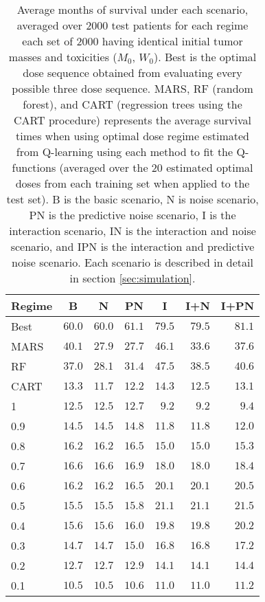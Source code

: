 \documentclass[12pt]{article}
\begin{document}
\begin{table}[!htbp]
\caption[Average months of survival under each scenario]{Average months of survival under each scenario, averaged over 2000 test patients for each regime each set of 2000 having identical initial tumor masses and toxicities ($M_{0}$, $W_{0}$). Best is the optimal dose sequence obtained from evaluating every possible three dose sequence. MARS, RF (random forest), and CART (regression trees using the CART procedure) represents the average survival times when using optimal dose regime estimated from Q-learning using each method to fit the Q-functions (averaged over the 20 estimated optimal doses from each training set when applied to the test set). B is the basic scenario, N is noise scenario, PN is the predictive noise scenario, I is the interaction scenario, IN is the interaction and noise scenario, and IPN is the interaction and predictive noise scenario. Each scenario is described in detail in section \ref{sec:simulation}.\label{tab:rewards}} 
\begin{center}
\begin{tabular}{lrrrrrr}
\toprule
\multicolumn{1}{c}{Regime}&\multicolumn{1}{c}{B}&\multicolumn{1}{c}{N}&\multicolumn{1}{c}{PN}&\multicolumn{1}{c}{I}&\multicolumn{1}{c}{I+N}&\multicolumn{1}{c}{I+PN}\tabularnewline
\midrule
Best&$60.0$&$60.0$&$61.1$&$79.5$&$79.5$&$81.1$\tabularnewline
MARS&$40.1$&$27.9$&$27.7$&$46.1$&$33.6$&$37.6$\tabularnewline
RF&$37.0$&$28.1$&$31.4$&$47.5$&$38.5$&$40.6$\tabularnewline
CART&$13.3$&$11.7$&$12.2$&$14.3$&$12.5$&$13.1$\tabularnewline
1&$12.5$&$12.5$&$12.7$&$ 9.2$&$ 9.2$&$ 9.4$\tabularnewline
0.9&$14.5$&$14.5$&$14.8$&$11.8$&$11.8$&$12.0$\tabularnewline
0.8&$16.2$&$16.2$&$16.5$&$15.0$&$15.0$&$15.3$\tabularnewline
0.7&$16.6$&$16.6$&$16.9$&$18.0$&$18.0$&$18.4$\tabularnewline
0.6&$16.2$&$16.2$&$16.5$&$20.1$&$20.1$&$20.5$\tabularnewline
0.5&$15.5$&$15.5$&$15.8$&$21.1$&$21.1$&$21.5$\tabularnewline
0.4&$15.6$&$15.6$&$16.0$&$19.8$&$19.8$&$20.2$\tabularnewline
0.3&$14.7$&$14.7$&$15.0$&$16.8$&$16.8$&$17.2$\tabularnewline
0.2&$12.7$&$12.7$&$12.9$&$14.1$&$14.1$&$14.4$\tabularnewline
0.1&$10.5$&$10.5$&$10.6$&$11.0$&$11.0$&$11.2$\tabularnewline
\bottomrule
\end{tabular}\end{center}
\end{table}
\end{document}
